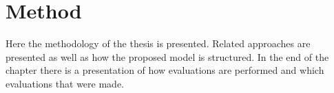 \chapter{Method}
\label{chapter:method}
Here the methodology of the thesis is presented. Related approaches are presented as well as how the proposed model is structured. In the end of the chapter there is a presentation of how evaluations are performed and which evaluations that were made.  







